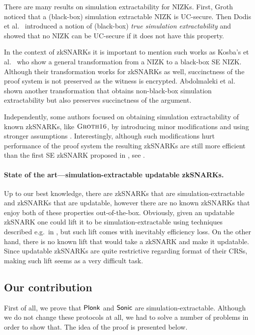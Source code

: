 \let\accentvec\vec \documentclass[runningheads,10pt]{llncs}
\begin{document}
There are many results on simulation extractability for
NIZKs.  First, Groth \cite{AC:Groth07} noticed that a (black-box) simulation
extractable NIZK is UC-secure. Then Dodis et al.~\cite{AC:DHLW10} introduced a
notion of (black-box) \emph{true simulation extractability} and showed that no
NIZK can be UC-secure if it does not have this property. 

In the context of zkSNARKs it is important to mention such works as Kosba's et
al.~\cite{EPRINT:KZMQCP15} who show a general transformation from a NIZK
to a black-box SE NIZK. Although their transformation works for zkSNARKs
as well, succinctness of the proof system is not preserved as the witness
is encrypted. 
Abdolmaleki et al.~\cite{EPRINT:AbdRamSla20} shown another transformation that
obtains non-black-box simulation extractability but also preserves succinctness
of the argument.

Independently, some authors focused on obtaining simulation extractability of
 known zkSNARKs, like $\textsc{Groth16}$, by introducing minor modifications and using
stronger assumptions \cite{EPRINT:BowGab18,EPRINT:AtaBag19}. Interestingly,
although such modifications hurt performance of the proof system the resulting
zkSNARKs are still more efficient than the first SE zkSNARK proposed in
\cite{C:GroMal17}, see \cite{EPRINT:AtaBag19}.  

\paragraph{State of the art---simulation-extractable updatable zkSNARKs.} 
Up to our best knowledge, there are zkSNARKs that are simulation-extractable
and zkSNARKs that are updatable, however there are no known zkSNARKs that enjoy
both of these properties out-of-the-box. Obviously, given an updatable zkSNARK
one could lift it to be simulation-extractable using techniques described
e.g.~in \cite{EPRINT:KZMQCP15,EPRINT:AbdRamSla20}, but such lift comes with
inevitably efficiency loss.  On the other hand, there is no known lift that
would take a zkSNARK and make it updatable. Since updatable zkSNARKs are quite
restrictive regarding format of their CRSs, making such lift seems as a very
difficult task. 

\subsection{Our contribution} 
First of all, we prove that $\textnormal{\textsf{Plonk}}$ and ${\textnormal{\textsf{Sonic}}}$ are simulation-extractable.
Although we do not change these protocols at all, we had to solve a number of
problems in order to show that. The idea of the proof is presented below. 
\end{document}
